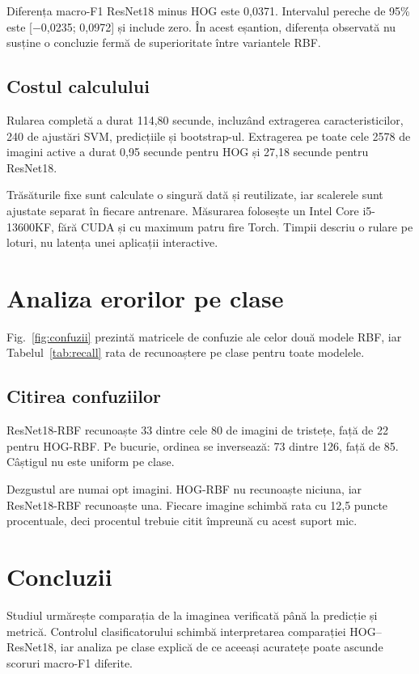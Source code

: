 \documentclass[conference]{IEEEtran}
\begin{document}
Diferența macro-F1 ResNet18 minus HOG este 0,0371. Intervalul pereche de 95\% este [$-$0,0235; 0,0972] și include zero. În acest eșantion, diferența observată nu susține o concluzie fermă de superioritate între variantele RBF.

\subsection{Costul calculului}
Rularea completă a durat 114,80 secunde, incluzând extragerea caracteristicilor, 240 de ajustări SVM, predicțiile și bootstrap-ul. Extragerea pe toate cele 2578 de imagini active a durat 0,95 secunde pentru HOG și 27,18 secunde pentru ResNet18.

Trăsăturile fixe sunt calculate o singură dată și reutilizate, iar scalerele sunt ajustate separat în fiecare antrenare. Măsurarea folosește un Intel Core i5-13600KF, fără CUDA și cu maximum patru fire Torch. Timpii descriu o rulare pe loturi, nu latența unei aplicații interactive.

\section{Analiza erorilor pe clase}
Fig.~\ref{fig:confuzii} prezintă matricele de confuzie ale celor două modele RBF, iar Tabelul~\ref{tab:recall} rata de recunoaștere pe clase pentru toate modelele.


\begin{table}[!t]
\caption{Rata de recunoaștere în procente și numărul de imagini din fiecare clasă}
\label{tab:recall}
\centering
\resizebox{\columnwidth}{!}{}
\end{table}

\subsection{Citirea confuziilor}
ResNet18-RBF recunoaște 33 dintre cele 80 de imagini de tristețe, față de 22 pentru HOG-RBF. Pe bucurie, ordinea se inversează: 73 dintre 126, față de 85. Câștigul nu este uniform pe clase.

Dezgustul are numai opt imagini. HOG-RBF nu recunoaște niciuna, iar ResNet18-RBF recunoaște una. Fiecare imagine schimbă rata cu 12,5 puncte procentuale, deci procentul trebuie citit împreună cu acest suport mic.

\section{Concluzii}
Studiul urmărește comparația de la imaginea verificată până la predicție și metrică. Controlul clasificatorului schimbă interpretarea comparației HOG--ResNet18, iar analiza pe clase explică de ce aceeași acuratețe poate ascunde scoruri macro-F1 diferite.
\end{document}
